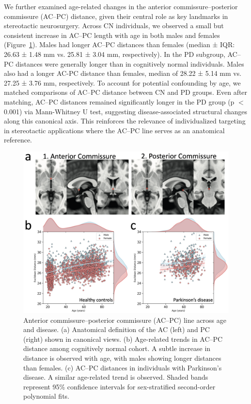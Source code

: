 We further examined age-related changes in the anterior commissure–posterior commissure (AC–PC) distance, given their central role as key landmarks in stereotactic neurosurgery. Across CN individuals, we observed a small but consistent increase in AC–PC length with age in both males and females (Figure~\ref{fig:ch3_Figure_acpc}). Males had longer AC–PC distances than females (median ± IQR: 26.63 ± 1.48 mm vs. 25.81 ± 3.04 mm, respectively). In the PD subgroup, AC–PC distances were generally longer than in cognitively normal individuals. Males also had a longer AC-PC distance than females, median of 28.22 ± 5.14 mm vs. 27.25 ± 3.76 mm, respectively. To account for potential confounding by age, we matched comparisons of AC–PC distance between CN and PD groups. Even after matching, AC–PC distances remained significantly longer in the PD group (p \(<\) 0.001) via Mann-Whitney U test, suggesting disease-associated structural changes along this canonical axis. This reinforces the relevance of individualized targeting in stereotactic applications where the AC–PC line serves as an anatomical reference.

\begin{figure}[hbt!]
    \centering
    \includegraphics[width=1\linewidth]{figs/ch3_Figure_acpc.png}
    \caption{Anterior commissure–posterior commissure (AC–PC) line across age and disease. (a) Anatomical definition of the AC (left) and PC (right) shown in canonical views. (b) Age-related trends in AC–PC distance among cognitively normal cohort. A subtle increase in distance is observed with age, with males showing longer distances than females. (c) AC–PC distances in individuals with Parkinson’s disease. A similar age-related trend is observed. Shaded bands represent 95\% confidence intervals for sex-stratified second-order polynomial fits.
    }
    \label{fig:ch3_Figure_acpc}
\end{figure}
